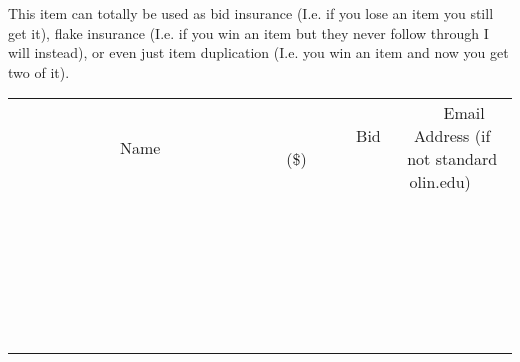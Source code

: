 \documentclass[11pt]{article}
\begin{document}
This item can totally be used as bid insurance (I.e. if you lose an item you still get it), flake insurance (I.e. if you win an item but they never follow through I will instead), or even just item duplication (I.e. you win an item and now you get two of it).
\\[6ex]
\begin{tabular}{c c c}
~~~~~~~~~~~~~Name~~~~~~~~~~~~~ & ~~~~~~~~~Bid (\$)~~~~~~~~~  & ~~~Email Address (if not standard olin.edu)~~~\\
 & & \\
\hline
 & & \\
\hline
 & & \\
\hline
 & & \\
\hline
 & & \\
\hline
 & & \\
\hline
 & & \\
\hline
 & & \\
\hline
 & & \\
\hline
 & & \\
\hline
 & & \\
\hline
 & & \\
\hline
 & & \\
\hline
 & & \\
\hline
 & & \\
\hline
 & & \\
\hline
 & & \\
\hline
 & & \\
\hline
 & & \\
\hline
 & & \\
\hline
 & & \\
\hline
 & & \\
\hline
 & & \\
\hline
 & & \\
\hline
 & & \\
\hline
 & & \\
\hline
\end{tabular}
\newpage
\end{document}

